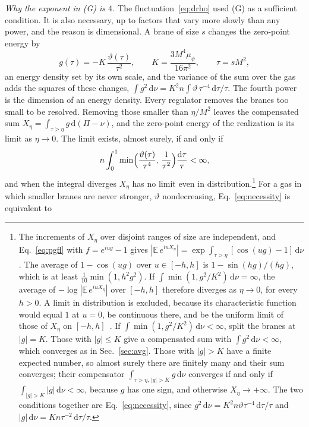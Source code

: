 \documentclass[a4paper,11pt]{article}
\newcommand{\bE}{\mathbb{E}}
\newcommand{\dd}{\mathrm{d}}
\begin{document}
\textit{Why the exponent in (G) is $4$.} The fluctuation~\eqref{eq:drho} used (G) as a sufficient condition. It is also necessary, up to factors that vary more slowly than any power, and the reason is dimensional. A brane of size $s$ changes the zero-point energy by
\[
g(\tau)=-K\,\frac{\vartheta(\tau)}{\tau^2},\qquad K=\frac{3M^4\mu_\psi}{16\pi^2},\qquad\tau=sM^2,
\]
an energy density set by its own scale, and the variance of the sum over the gas adds the squares of these changes, $\int g^2\,\dd\nu=K^2n\int\vartheta\,\tau^{-4}\,\dd\tau/\tau$. The fourth power is the dimension of an energy density. Every regulator removes the branes too small to be resolved. Removing those smaller than $\eta/M^2$ leaves the compensated sum $X_\eta=\int_{\tau>\eta}g\,\dd(\Pi-\nu)$, and the zero-point energy of the realization is its limit as $\eta\to0$. The limit exists, almost surely, if and only if
\begin{equation}
\label{eq:necessity}
n\int_0^1\min\Bigl(\frac{\vartheta(\tau)}{\tau^{4}},\,\frac1{\tau^{2}}\Bigr)\frac{\dd\tau}\tau<\infty ,
\end{equation}
and when the integral diverges $X_\eta$ has no limit even in distribution.\footnote{The increments of $X_\eta$ over disjoint ranges of size are independent, and Eq.~\eqref{eq:pgfl} with $f=e^{iug}-1$ gives $|\bE\,e^{iuX_\eta}|=\exp\int_{\tau>\eta}[\cos(ug)-1]\,\dd\nu$. The average of $1-\cos(ug)$ over $u\in[-h,h]$ is $1-\sin(hg)/(hg)$, which is at least $\frac1{10}\min(1,h^2g^2)$. If $\int\min(1,g^2/K^2)\,\dd\nu=\infty$, the average of $-\log|\bE\,e^{iuX_\eta}|$ over $[-h,h]$ therefore diverges as $\eta\to0$, for every $h>0$. A limit in distribution is excluded, because its characteristic function would equal $1$ at $u=0$, be continuous there, and be the uniform limit of those of $X_\eta$ on $[-h,h]$~\cite{Feller1971}. If $\int\min(1,g^2/K^2)\,\dd\nu<\infty$, split the branes at $|g|=K$. Those with $|g|\le K$ give a compensated sum with $\int g^2\,\dd\nu<\infty$, which converges as in Sec.~\ref{sec:avg}. Those with $|g|>K$ have a finite expected number, so almost surely there are finitely many and their sum converges; their compensator $\int_{\tau>\eta,\,|g|>K}g\,\dd\nu$ converges if and only if $\int_{|g|>K}|g|\,\dd\nu<\infty$, because $g$ has one sign, and otherwise $X_\eta\to+\infty$. The two conditions together are Eq.~\eqref{eq:necessity}, since $g^2\,\dd\nu=K^2n\vartheta\tau^{-4}\,\dd\tau/\tau$ and $|g|\,\dd\nu=Kn\tau^{-2}\,\dd\tau/\tau$.} For a gas in which smaller branes are never stronger, $\vartheta$ nondecreasing, Eq.~\eqref{eq:necessity} is equivalent to
\end{document}

